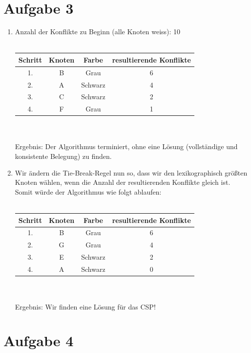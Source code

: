 \documentclass[a4paper,10pt]{article}
\begin{document}
\section*{Aufgabe 3}

\begin{enumerate}[~~a)]

\item
Anzahl der Konflikte zu Beginn (alle Knoten weiss): 10 \\
\\
\begin{tabular}{|c|c|c|c|}
\hline
Schritt & Knoten & Farbe & resultierende Konflikte  \\ \hline
1. & B & Grau & 6 \\ \hline
2. & A & Schwarz & 4 \\ \hline
3. & C & Schwarz & 2 \\ \hline
4. & F & Grau & 1 \\ \hline
\end{tabular} \\ \\
Ergebnis: Der Algorithmus terminiert, ohne eine Lösung (vollständige und konsistente Belegung) zu finden.

\item
Wir ändern die Tie-Break-Regel nun so, dass wir den lexikographisch größten Knoten wählen, wenn die Anzahl der resultierenden Konflikte gleich ist. Somit würde der Algorithmus wie folgt ablaufen: \\
\\
\begin{tabular}{|c|c|c|c|}
\hline
Schritt & Knoten & Farbe & resultierende Konflikte  \\ \hline
1. & B & Grau & 6 \\ \hline
2. & G & Grau & 4 \\ \hline
3. & E & Schwarz & 2 \\ \hline
4. & A & Schwarz & 0 \\ \hline
\end{tabular} \\ \\
Ergebnis: Wir finden eine Lösung für das CSP!

\end{enumerate}

\section*{Aufgabe 4}
\end{document}
